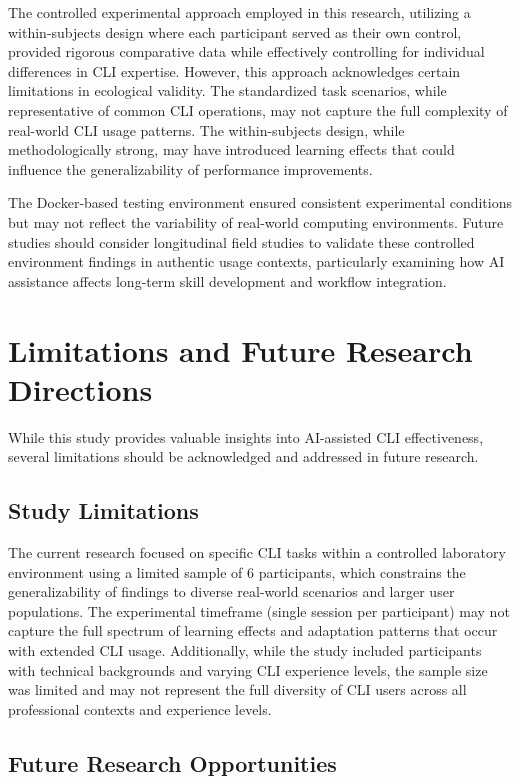 The controlled experimental approach employed in this research, utilizing a within-subjects design where each participant served as their own control, provided rigorous comparative data while effectively controlling for individual differences in CLI expertise. However, this approach acknowledges certain limitations in ecological validity. The standardized task scenarios, while representative of common CLI operations, may not capture the full complexity of real-world CLI usage patterns. The within-subjects design, while methodologically strong, may have introduced learning effects that could influence the generalizability of performance improvements.

The Docker-based testing environment ensured consistent experimental conditions but may not reflect the variability of real-world computing environments. Future studies should consider longitudinal field studies to validate these controlled environment findings in authentic usage contexts, particularly examining how AI assistance affects long-term skill development and workflow integration.

\section{Limitations and Future Research Directions}

While this study provides valuable insights into AI-assisted CLI effectiveness, several limitations should be acknowledged and addressed in future research.

\subsection{Study Limitations}

The current research focused on specific CLI tasks within a controlled laboratory environment using a limited sample of 6 participants, which constrains the generalizability of findings to diverse real-world scenarios and larger user populations. The experimental timeframe (single session per participant) may not capture the full spectrum of learning effects and adaptation patterns that occur with extended CLI usage. Additionally, while the study included participants with technical backgrounds and varying CLI experience levels, the sample size was limited and may not represent the full diversity of CLI users across all professional contexts and experience levels.

\subsection{Future Research Opportunities}

